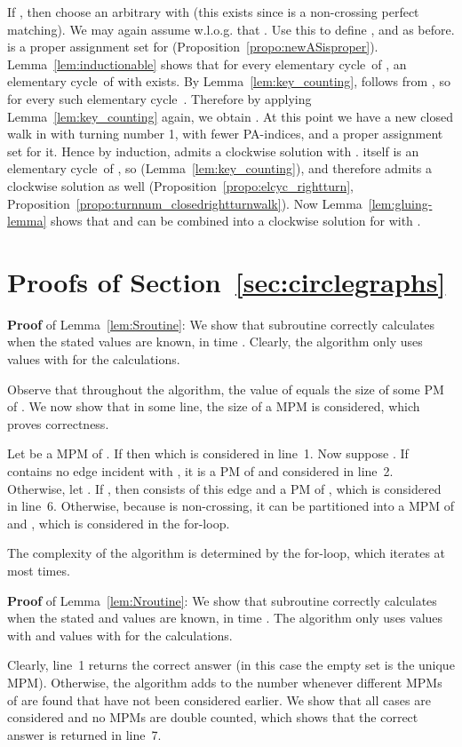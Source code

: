 \documentclass{llncs}
\newcommand{\QED}{\hspace*{\fill}{}\medskip}
\newcommand{\elcyc}{elementary cycle}
\begin{document}
If , then choose an arbitrary  with  (this exists since  is a non-crossing perfect matching). We may again assume w.l.o.g. that .
Use this to define ,  and  as before.
 is a proper assignment set for  (Proposition~\ref{propo:newASisproper}).
Lemma~\ref{lem:inductionable} shows that for every \elcyc\  of , an \elcyc\  of  with  exists. By Lemma~\ref{lem:key_counting},  follows from , so  for every such \elcyc\ . 
Therefore by applying Lemma~\ref{lem:key_counting} again, we obtain . 
At this point we have a new closed walk  in  with turning number 1, with fewer PA-indices, and a proper assignment set  for it. Hence by induction,  admits a clockwise solution  with .
 itself is an \elcyc\ of , so  (Lemma~\ref{lem:key_counting}), and therefore  admits a clockwise solution  as well (Proposition~\ref{propo:elcyc_rightturn}, Proposition~\ref{propo:turnnum_closedrightturnwalk}). 
Now Lemma~\ref{lem:gluing-lemma} shows that  and  can be combined into a clockwise solution  for  with .
\QED



\section{Proofs of Section~\ref{sec:circlegraphs}}

{\bf Proof} of Lemma~\ref{lem:Sroutine}:
We show that subroutine  correctly calculates  when the stated  values are known, in time .
Clearly, the algorithm only uses values  with  for the calculations.

Observe that throughout the algorithm, the value of  equals the size of some PM of .
We now show that in some line, the size of a MPM is considered, which proves correctness.


Let  be a MPM of . If  then  which is considered in line~1. Now suppose . If  contains no edge incident with , it is a PM of  and considered in line~2. Otherwise, let . If , then  consists of this edge and a PM of , which is considered in line~6. Otherwise, because  is non-crossing, it can be partitioned into a MPM of  and , which is considered in the for-loop.

The complexity of the algorithm is determined by the for-loop, which iterates at most  times.
\QED

{\bf Proof} of Lemma~\ref{lem:Nroutine}:
We show that subroutine  correctly calculates  when the stated  and  values are known, in time .
The algorithm only uses values  with  and values  with  for the calculations. 

Clearly, line~1 returns the correct answer (in this case the empty set is the unique MPM). Otherwise, the algorithm adds  to the number  whenever  different MPMs of  are found that have not been considered earlier. We show that all cases are considered and no MPMs are double counted, which shows that the correct answer is returned in line~7.
\end{document}
